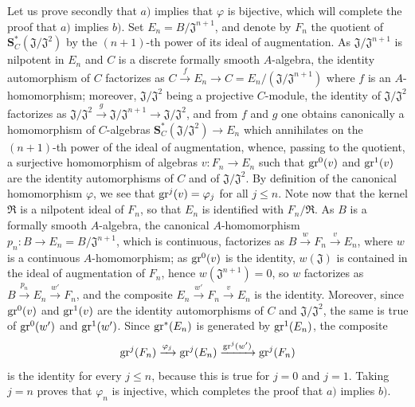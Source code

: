 \begin{env}[19.5.4.2]
\label{0.19.5.4.2}
Let us prove secondly that $a)$ implies that $\varphi$ is bijective, which will complete the proof that $a)$ implies $b)$.
Set $E_n=B/\mathfrak{J}^{n+1}$, and denote by $F_n$ the quotient of $\mathbf{S}_C^*(\mathfrak{J}/\mathfrak{J}^2)$ by the $(n+1)$-th power of its ideal of augmentation.
As $\mathfrak{J}/\mathfrak{J}^{n+1}$ is nilpotent in $E_n$ and $C$ is a discrete formally smooth $A$-algebra, the identity automorphism of $C$ factorizes as $C\xrightarrow{f}E_n\to C=E_n/(\mathfrak{J}/\mathfrak{J}^{n+1})$ where $f$ is an $A$-homomorphism;
 moreover, $\mathfrak{J}/\mathfrak{J}^2$ being a projective $C$-module, the identity of $\mathfrak{J}/\mathfrak{J}^2$ factorizes as $\mathfrak{J}/\mathfrak{J}^2\xrightarrow{g}\mathfrak{J}/\mathfrak{J}^{n+1}\to\mathfrak{J}/\mathfrak{J}^2$, and from $f$ and $g$ one obtains canonically a homomorphism of $C$-algebras $\mathbf{S}_C^*(\mathfrak{J}/\mathfrak{J}^2)\to E_n$ which annihilates on the $(n+1)$-th power of the ideal of augmentation, whence, passing to the quotient, a surjective homomorphism of algebras $v:F_n\to E_n$ such that $\operatorname{gr}^0(v)$ and $\operatorname{gr}^1(v)$ are the identity automorphisms of $C$ and of $\mathfrak{J}/\mathfrak{J}^2$.
By definition of the canonical homomorphism $\varphi$, we see that $\operatorname{gr}^j(v)=\varphi_j$ for all $j\leq n$.
Note now that the kernel $\mathfrak{R}$ is a nilpotent ideal of $F_n$, so that $E_n$ is identified with $F_n/\mathfrak{R}$.
As $B$ is a formally smooth $A$-algebra, the canonical $A$-homomorphism $p_n:B\to E_n=B/\mathfrak{J}^{n+1}$, which is continuous, factorizes as $B\xrightarrow{w}F_n\xrightarrow{v}E_n$, where $w$ is a continuous $A$-homomorphism;
as $\operatorname{gr}^0(v)$ is the identity, $w(\mathfrak{J})$ is contained in the ideal of augmentation of $F_n$, hence $w(\mathfrak{J}^{n+1})=0$,
so $w$ factorizes as $B\xrightarrow{p_n}E_n\xrightarrow{w'}F_n$, and the composite $E_n\xrightarrow{w'}F_n\xrightarrow{v}E_n$ is the identity.
Moreover, since $\operatorname{gr}^0(v)$ and $\operatorname{gr}^1(v)$ are the identity automorphisms of $C$ and $\mathfrak{J}/\mathfrak{J}^2$, the same is true of $\operatorname{gr}^0(w')$ and $\operatorname{gr}^1(w')$.
Since $\operatorname{gr}^*(E_n)$ is generated by $\operatorname{gr}^1(E_n)$, the composite
\[
  \operatorname{gr}^j(F_n)\xrightarrow{\varphi_j}\operatorname{gr}^j(E_n)
  \xrightarrow{\operatorname{gr}^j(w')}\operatorname{gr}^j(F_n)
\]
is the identity for every $j\leq n$, because this is true for $j=0$ and $j=1$.
Taking $j=n$ proves that $\varphi_n$ is injective, which completes the proof that $a)$ implies $b)$.
\end{env}

